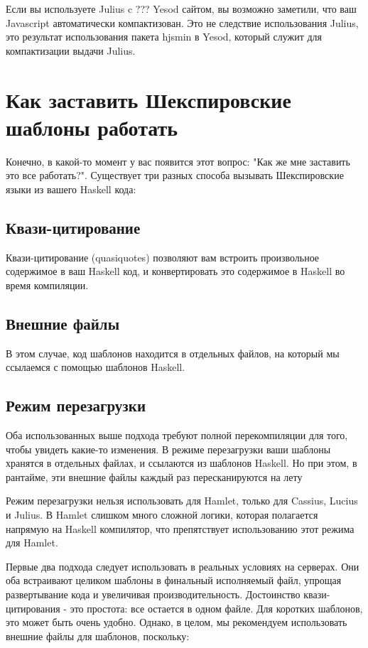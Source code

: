 Если вы используете Julius c ??? Yesod сайтом, вы возможно заметили, что ваш
Javascript автоматически компактизован. Это не следствие использования Julius, это
результат использования пакета hjsmin в Yesod, который служит для компактизации
выдачи Julius.

\section{Как заставить Шекспировские шаблоны работать}

Конечно, в какой-то момент у вас появится этот вопрос: "Как же мне заставить это
все работать?". Существует три разных способа вызывать Шекспировские языки 
из вашего Haskell кода:

\subsection{Квази-цитирование}
Квази-цитирование (quasiquotes) позволяют вам встроить произвольное содержимое в ваш Haskell код, и
конвертировать это содержимое в Haskell во время компиляции.

\subsection {Внешние файлы}
В этом случае, код шаблонов находится в отдельных файлов, на который мы ссылаемся
с помощью шаблонов Haskell.

\subsection {Режим перезагрузки}
Оба использованных выше подхода требуют полной перекомпиляции для того, чтобы увидеть
какие-то изменения. В режиме перезагрузки ваши шаблоны хранятся в отдельных файлах,
и ссылаются из шаблонов Haskell. Но при этом, в рантайме, эти внешние файлы 
каждый раз пересканируются на лету

Режим перезагрузки нельзя использовать для Hamlet, только для Cassius, Lucius и Julius.
В Hamlet слишком много сложной логики, которая полагается напрямую на Haskell
компилятор, что препятствует использованию этот режима для Hamlet.

Первые два подхода следует использовать в реальных условиях на серверах.
Они оба встраивают целиком шаблоны в финальный исполняемый файл, упрощая 
развертывание кода и увеличивая производительность.
Достоинство квази-цитирования - это простота: все остается в одном файле.
Для коротких шаблонов, это может быть очень удобно. Однако, в целом, мы рекомендуем
использовать внешние файлы для шаблонов, поскольку:

